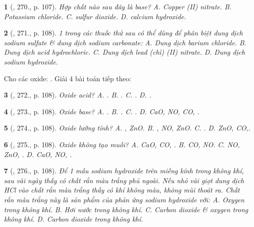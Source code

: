 \documentclass{article}
\newtheorem{baitoan}{}
\begin{document}
\begin{baitoan}[\cite{Nguyen_Buu_Can_500_BT_Hoa_Hoc_THCS}, 270., p. 107]
	 Hợp chất nào sau đây là base? {\sf A.} Copper ({\rm II}) nitrate. {\sf B.} Potassium chloride. {\sf C.} sulfur dioxide. {\sf D.} calcium hydroxide.
\end{baitoan}

\begin{baitoan}[\cite{Nguyen_Buu_Can_500_BT_Hoa_Hoc_THCS}, 271., p. 108]
	1 trong các thuốc thử sau có thể dùng để phân biệt dung dịch sodium sulfate \& dung dịch sodium carbonate: {\sf A.} Dung dịch barium chloride. {\sf B.} Dung dịch acid hydrochloric. {\sf C.} Dung dịch lead (chì) ({\rm II}) nitrate. {\sf D.} Dung dịch sodium hydroxide.
\end{baitoan}

Cho các oxide: . Giải 4 bài toán tiếp theo:

\begin{baitoan}[\cite{Nguyen_Buu_Can_500_BT_Hoa_Hoc_THCS}, 272., p. 108]
	Oxide acid? {\rm{\sf A.} . {\sf B.} . {\sf C.} . {\sf D.} .}
\end{baitoan}

\begin{baitoan}[\cite{Nguyen_Buu_Can_500_BT_Hoa_Hoc_THCS}, 273., p. 108]
	Oxide base? {\rm{\sf A.} . {\sf B.} . {\sf C.} . {\sf D.} CaO, NO, CO, .}
\end{baitoan}

\begin{baitoan}[\cite{Nguyen_Buu_Can_500_BT_Hoa_Hoc_THCS}, 274., p. 108]
	Oxide lưỡng tính? {\rm{\sf A.} , ZnO. {\sf B.} , NO, ZnO. {\sf C.} . {\sf D.} ZnO, CO,.}
\end{baitoan}

\begin{baitoan}[\cite{Nguyen_Buu_Can_500_BT_Hoa_Hoc_THCS}, 275., p. 108]
	Oxide không tạo muối? {\rm{\sf A.} CaO, CO, . {\sf B.} CO, NO. {\sf C.} NO, ZnO, . {\sf D.} CaO, NO, .}
\end{baitoan}

\begin{baitoan}[\cite{Nguyen_Buu_Can_500_BT_Hoa_Hoc_THCS}, 276., p. 108]
	Để 1 mẫu sodium hydroxide trên miếng kính trong không khí, sau vài ngày thấy có chất rắn màu trắng phủ ngoài. Nếu nhỏ vài giọt dung dịch {\rm HCl} vào chất rắn màu trắng thấy có khí không màu, không mùi thoát ra. Chất rắn màu trắng này là sản phẩm của phản ứng sodium hydroxide với: {\sf A.} Oxygen trong không khí. {\sf B.} Hơi nước trong không khí. {\sf C.} Carbon dioxide \& oxygen trong không khí. {\sf D.} Carbon dioxide trong không khí.
\end{baitoan}
\end{document}
